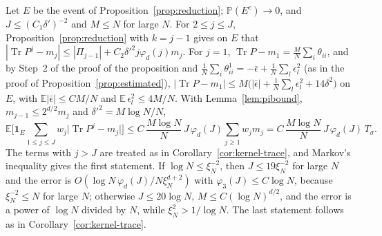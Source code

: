 \documentclass[11pt,a4paper]{article}
\makeatletter
\theoremstyle{stmt}
\theoremstyle{defn}
\theoremstyle{rmk}
\renewenvironment{proof}[1][\proofname]{\par\pushQED{\qed}\normalfont\topsep6\p@\@plus6\p@\relax
  \trivlist\item[\hskip\labelsep{\sffamily\itshape\small #1.}]\ignorespaces}{\popQED\endtrivlist\@endpefalse}
\numberwithin{equation}{section}
\DeclareMathOperator{\Tr}{Tr}
\makeatother
\begin{document}
{\begin{proof}
Let $E$ be the event of Proposition~\ref{prop:reduction}; $\mathbb P(E^c)\to0$, and $J\le(C_1\delta')^{-2}$ and $M\le N$ for large $N$. For $2\le j\le J$, Proposition~\ref{prop:reduction} with $k=j-1$ gives on $E$ that $|\Tr P^j-m_j|\le|\Pi_{j-1}|+C_2\delta'^2j\varphi_d(j)m_j$. For $j=1$, $\Tr P-m_1=\frac MN\sum_i\theta_{ii}$, and by Step~2 of the proof of the proposition and $\frac1N\sum_i\theta^1_{ii}=-\bar\epsilon+\frac1N\sum_l\epsilon_l^2$ (as in the proof of Proposition~\ref{prop:estimated}), $|\Tr P-m_1|\le M\big(|\bar\epsilon|+\frac1N\sum_l\epsilon_l^2+14\delta^2\big)$ on $E$, with $\mathbb E|\bar\epsilon|\le CM/N$ and $\mathbb E\,\epsilon_l^2\le4M/N$. With Lemma~\ref{lem:pibound}, $m_{j-1}\le2^{d/2}m_j$ and $\delta'^2=M\log N/N$,
\[
\mathbb E\Big[\mathbf 1_E\sum_{1\le j\le J}w_j\big|\Tr P^j-m_j\big|\Big]\le C\,\frac{M\log N}{N}\,J\,\varphi_d(J)\sum_{j\ge1}w_jm_j=C\,\frac{M\log N}{N}\,J\,\varphi_d(J)\,T_\sigma .
\]
The terms with $j>J$ are treated as in Corollary~\ref{cor:kernel-trace}, and Markov's inequality gives the first statement. If $\log N\le\xi_N^{-2}$, then $J\le19\xi_N^{-2}$ for large $N$ and the error is $O(\log N\,\varphi_d(J)/N\xi_N^{d+2})$ with $\varphi_3(J)\le C\log N$, because $\xi_N^{-2}\le N$ for large $N$; otherwise $J\le20\log N$, $M\le C(\log N)^{d/2}$, and the error is a power of $\log N$ divided by $N$, while $\xi_N^2>1/\log N$. The last statement follows as in Corollary~\ref{cor:kernel-trace}.
\end{proof}

}
\end{document}
